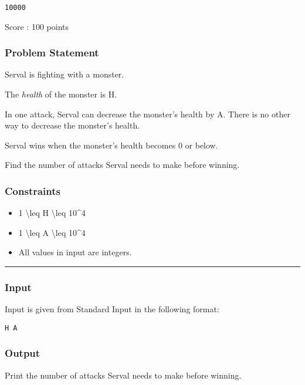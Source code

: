 \begin{verbatim}
10000
\end{verbatim}

Score : 100 points

\subsubsection{Problem Statement}

Serval is fighting with a monster.

The \emph{health} of the monster is H.

In one attack, Serval can decrease the monster's health by A. There is
no other way to decrease the monster's health.

Serval wins when the monster's health becomes 0 or below.

Find the number of attacks Serval needs to make before winning.

\subsubsection{Constraints}

\begin{itemize}
\tightlist
\item
  1 \textbackslash leq H \textbackslash leq 10\^{}4
\item
  1 \textbackslash leq A \textbackslash leq 10\^{}4
\item
  All values in input are integers.
\end{itemize}

\begin{center}\rule{0.5\linewidth}{\linethickness}\end{center}

\subsubsection{Input}

Input is given from Standard Input in the following format:

\begin{verbatim}
H A
\end{verbatim}

\subsubsection{Output}

Print the number of attacks Serval needs to make before winning.

